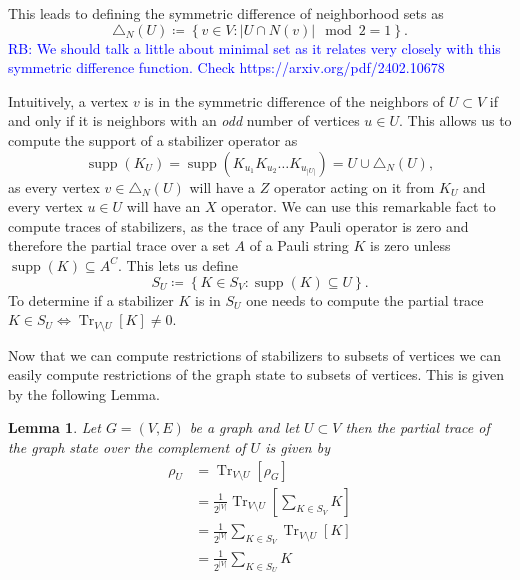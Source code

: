 \documentclass{article}
\newtheorem{lemma}[theorem]{Lemma}
\newcommand{\rb}[1]{{\textcolor{blue}{RB: #1}}}
\DeclareMathOperator{\Tr}{Tr}
\newcommand{\brackets}[1]{\left[ #1 \right]}
\newcommand{\set}[1]{\left\{ #1 \right\}}
\newcommand{\partrace}[2]{\Tr_{#1} \brackets{ #2 }}
\DeclareMathOperator{\supp}{supp}
\begin{document}
This leads to defining the symmetric difference of neighborhood sets as 
\begin{equation}
    \triangle_N(U) \coloneqq \set{v \in V : | U \cap N(v) | \mod 2 = 1}.
\end{equation}
\rb{We should talk a little about minimal set as it relates very closely with this symmetric difference function. Check https://arxiv.org/pdf/2402.10678}

Intuitively, a vertex $v$ is in the symmetric difference of the neighbors of $U \subset V$ if and only if it is neighbors with an \emph{odd} number of vertices $u \in U$. This allows us to compute the support of a stabilizer operator as
\begin{equation}
    \supp(K_U) = \supp(K_{u_1} K_{u_2} \ldots K_{u_{|U|}}) = U \cup \triangle_N(U),
\end{equation}
as every vertex $v \in \triangle_N(U)$ will have a $Z$ operator acting on it from $K_U$ and every vertex $u \in U$ will have an $X$ operator. We can use this remarkable fact to compute traces of stabilizers, as the trace of any Pauli operator is zero and therefore the partial trace over a set $A$ of a Pauli string $K$ is zero unless $\supp(K) \subseteq A^C$. This lets us define
\begin{equation}
    S_U \coloneqq \set{K \in S_V : \supp(K) \subseteq U }.
\end{equation}
To determine if a stabilizer $K$ is in $S_U$ one needs to compute the partial trace $K \in S_U \iff \partrace{V \setminus U}{K} \neq 0$.

Now that we can compute restrictions of stabilizers to subsets of vertices we can easily compute restrictions of the graph state to subsets of vertices. This is given by the following Lemma.
\begin{lemma}
    Let $G=(V,E)$ be a graph and let $U\subset V$ then the partial trace of the graph state over the complement of $U$ is given by
    \begin{align}
        \rho_U &= \partrace{V \setminus U}{\rho_G} \\
        &= \frac{1}{2^{|V|}} \partrace{V \setminus U}{\sum_{K \in S_V} K} \\
        &= \frac{1}{2^{|V|}} \sum_{K \in S_V} \partrace{V \setminus U}{ K} \\
        &= \frac{1}{2^{|V|}} \sum_{K \in S_U} K
    \end{align}
    
\end{lemma}
\end{document}
